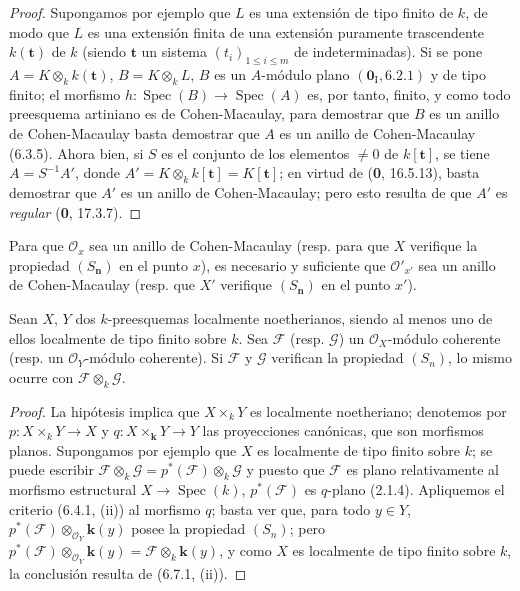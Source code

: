 \begin{proof}
Supongamos por ejemplo que $L$ es una extensión de tipo finito de $k$,
de modo que $L$ es una extensión finita de una extensión puramente
trascendente $k(\mathbf t)$ de $k$ (siendo $\mathbf t$ un sistema
$(t_i)_{1\leqslant i\leqslant m}$ de indeterminadas). Si se pone
$A=K\otimes_k k(\mathbf t)$, $B=K\otimes_k L$, $B$ es un $A$-módulo
plano $(\mathbf{0}_{\mathrm I},6.2.1)$ y de tipo finito; el morfismo
$h:\operatorname{Spec}(B)\to\operatorname{Spec}(A)$ es, por tanto, finito,
y como todo preesquema artiniano es de Cohen-Macaulay, para demostrar que
$B$ es un anillo de Cohen-Macaulay basta demostrar que $A$ es un anillo de
Cohen-Macaulay (6.3.5). Ahora bien, si $S$ es el conjunto de los elementos
$\neq 0$ de $k[\mathbf t]$, se tiene $A=S^{-1}A'$, donde
$A'=K\otimes_k k[\mathbf t]=K[\mathbf t]$; en virtud de
(\textbf 0, 16.5.13), basta demostrar que $A'$ es un anillo de Cohen-Macaulay; pero
esto resulta de que $A'$ es \emph{regular} (\textbf 0, 17.3.7).
\end{proof}

\begin{corollary}[6.7.2]
Para que $\mathcal O_x$ sea un anillo de Cohen-Macaulay \textup{(resp.} para
que $X$ verifique la propiedad $(S_{\boldsymbol{n}})$ en el punto $x$), es necesario y
suficiente que $\mathcal O'_{x'}$ sea un anillo de Cohen-Macaulay \textup{(resp.} que
$X'$ verifique $(S_{\boldsymbol{n}})$ en el punto $x'$).
\end{corollary}

\begin{corollary}[6.7.3]
\label{IV.2.s6.7.3-fr}
Sean $X$, $Y$ dos $k$-preesquemas localmente noetherianos, siendo al menos
uno de ellos localmente de tipo finito sobre $k$. Sea $\mathscr F$ \textup{(resp.}
$\mathscr G$) un $\mathcal O_X$-módulo coherente \textup{(resp.} un
$\mathcal O_Y$-módulo coherente). Si $\mathscr F$ y $\mathscr G$
verifican la propiedad $(S_n)$, lo mismo ocurre con
$\mathscr F\otimes_k\mathscr G$.
\end{corollary}

\begin{proof}
La hipótesis implica que $X\times_kY$ es localmente noetheriano; denotemos
por $p:X\times_kY\to X$ y $q:X\times_{\boldsymbol k}Y\to Y$ las proyecciones canónicas,
que son morfismos planos. Supongamos por ejemplo que $X$ es localmente de
tipo finito sobre $k$; se puede escribir
$\mathscr F\otimes_k\mathscr G=p^*(\mathscr F)\otimes_k\mathscr G$
y puesto que $\mathscr F$ es plano relativamente al morfismo estructural
$X\to\operatorname{Spec}(k)$, $p^*(\mathscr F)$ es $q$-plano (2.1.4).
Apliquemos el criterio (6.4.1, (ii)) al morfismo $q$; basta ver que, para
todo $y\in Y$, $p^*(\mathscr F)\otimes_{\mathcal O_Y}\boldsymbol{k}(y)$ posee la
propiedad $(S_n)$; pero
$p^*(\mathscr F)\otimes_{\mathcal O_Y}\boldsymbol{k}(y)=\mathscr F\otimes_k \boldsymbol{k}(y)$,
y como $X$ es localmente de tipo finito sobre $k$, la conclusión resulta
de (6.7.1, (ii)).
\end{proof}
